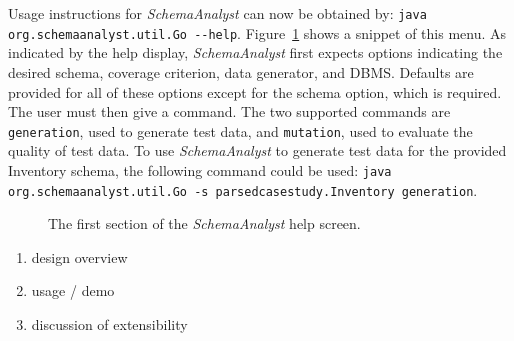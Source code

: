 Usage instructions for \textit{SchemaAnalyst} can now be obtained by: 
\lstinline{java org.schemaanalyst.util.Go --help}. Figure~\ref{fig:usage} shows a snippet of this menu.
As indicated by the help display, \textit{SchemaAnalyst} first expects options indicating the desired
schema, coverage criterion, data generator, and DBMS. Defaults are provided for all of these options
except for the schema option, which is required. The user must then give a command.  The two supported
commands are \lstinline{generation}, used to generate test data, and \lstinline{mutation}, used to
evaluate the quality of test data.
To use \textit{SchemaAnalyst} to generate test data for the provided Inventory schema, the following
command could be used: 
\lstinline{java org.schemaanalyst.util.Go -s parsedcasestudy.Inventory generation}.

\begin{figure}

\caption{\label{fig:usage} The first section of the \textit{SchemaAnalyst} help screen.}
\end{figure}

\begin{enumerate}
\item design overview 
\item usage / demo
\item discussion of extensibility
\end{enumerate}
